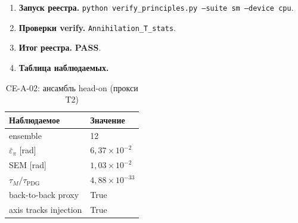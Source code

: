 \label{exp:cea02}
\begin{enumerate}[label=\textbf{Шаг \arabic*:},leftmargin=*,itemsep=0.35em]
\item \textbf{Запуск реестра.} \texttt{python verify\_principles.py --suite sm --device cpu}.
\item \textbf{Проверки verify.} \texttt{Annihilation\_T\_stats}.
\item \textbf{Итог реестра.} \textbf{PASS}.
\item \textbf{Таблица наблюдаемых.}
\end{enumerate}
\medskip
\begin{table}[htbp]
\centering
\small
\caption{CE-A-02: ансамбль head-on (прокси T2)}
\label{tab:exp-ce-a-02}
\begin{tabular}{@{}ll@{}}
\toprule
Наблюдаемое & Значение \\
\midrule
ensemble & 12 \\
$\bar\varepsilon_\pi$ [rad] & $6{,}37\times 10^{-2}$ \\
SEM [rad] & $1{,}03\times 10^{-2}$ \\
$\tau_M/\tau_{\mathrm{PDG}}$ & $4{,}88\times 10^{-33}$ \\
back-to-back proxy & True \\
axis tracks injection & True \\
\bottomrule
\end{tabular}
\end{table}
